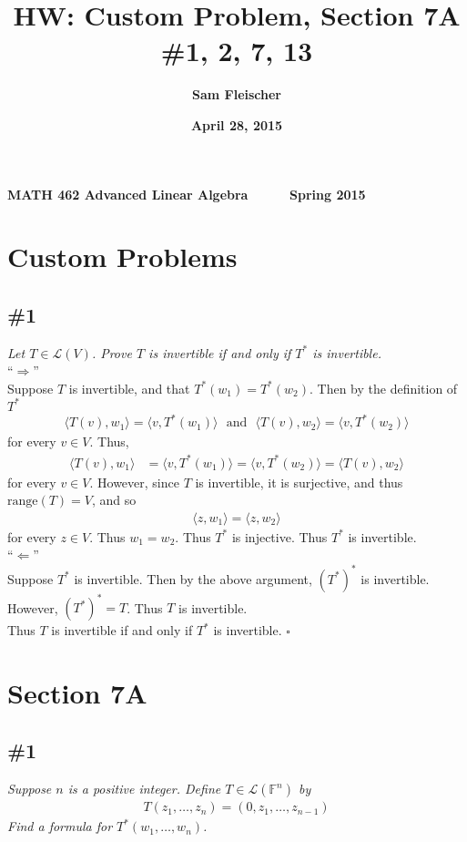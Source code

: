 \documentclass[12pt]{article}
\title{\bf HW: Custom Problem, Section 7A \#1, 2, 7, 13}
\author{\bf Sam Fleischer}
\date{\bf April 28, 2015}
\begin{document}
{\bf MATH 462 \hfill Advanced Linear Algebra \ \ \ \ \ \hfill Spring 2015} 

{\let\newpage\relax\maketitle}

\section*{Custom Problems}
\subsection*{\#1}
{\it Let $T \in \mathcal{L}(V)$.  Prove $T$ is invertible if and only if $T^*$ is invertible.} \\

\noindent ``$\Longrightarrow$'' \\
Suppose $T$ is invertible, and that $T^*(w_1) = T^*(w_2)$.  Then by the definition of $T^*$
\begin{align*}
	\langle T(v), w_1\rangle = \langle v, T^*(w_1)\rangle \ \ \ \text{and}\ \ \ \langle T(v), w_2\rangle = \langle v, T^*(w_2)\rangle
\end{align*}
for every $v \in V$.  Thus,
\begin{align*}
	\langle T(v), w_1 \rangle &= \langle v, T^*(w_1) \rangle = \langle v, T^*(w_2) \rangle = \langle T(v), w_2 \rangle
\end{align*}
for every $v \in V$.  However, since $T$ is invertible, it is surjective, and thus $\text{range}(T) = V$, and so 
\begin{align*}
	\langle z, w_1 \rangle = \langle z, w_2 \rangle
\end{align*}
for every $z \in V$.  Thus $w_1 = w_2$.  Thus $T^*$ is injective.  Thus $T^*$ is invertible. \\

\noindent ``$\Longleftarrow$'' \\
Suppose $T^*$ is invertible.  Then by the above argument, $(T^*)^*$ is invertible.  However, $(T^*)^* = T$.  Thus $T$ is invertible. \\

\noindent Thus $T$ is invertible if and only if $T^*$ is invertible. \hfill $\square$

\section*{Section 7A}
\subsection*{\#1}
{\it Suppose $n$ is a positive integer.  Define $T \in \mathcal{L}(\mathbb{F}^n)$ by}
\begin{align*}
	T(z_1, \dots, z_n) = (0, z_1, \dots, z_{n-1})
\end{align*}
{\it Find a formula for $T^*(w_1, \dots, w_n)$.} \\
\end{document}
